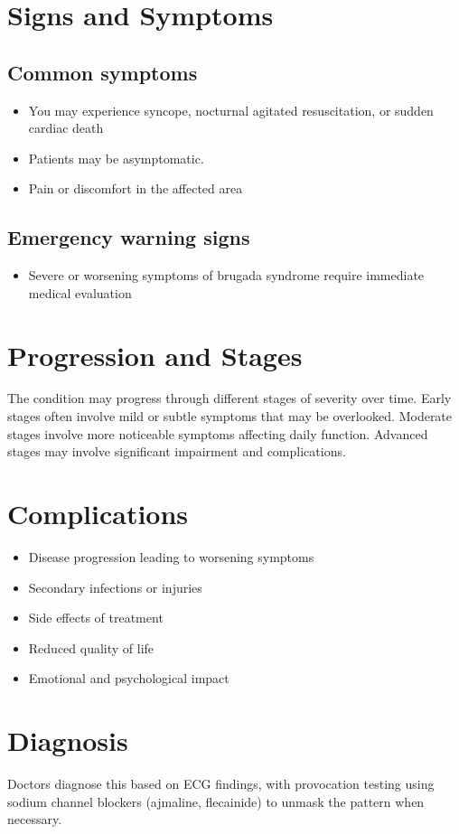 \section{Signs and Symptoms}

\subsection{Common symptoms}
\begin{itemize}[noitemsep]
  \item You may experience syncope, nocturnal agitated resuscitation, or sudden cardiac death
  \item Patients may be asymptomatic.
  \item Pain or discomfort in the affected area
  \end{itemize}

\subsection{Emergency warning signs}
\begin{itemize}[noitemsep]
  \item Severe or worsening symptoms of brugada syndrome require immediate medical evaluation
\end{itemize}
\section{Progression and Stages}
The condition may progress through different stages of severity over time. Early stages often involve mild or subtle symptoms that may be overlooked. Moderate stages involve more noticeable symptoms affecting daily function. Advanced stages may involve significant impairment and complications.
\section{Complications}
\begin{itemize}[noitemsep]
  \item Disease progression leading to worsening symptoms
  \item Secondary infections or injuries
  \item Side effects of treatment
  \item Reduced quality of life
  \item Emotional and psychological impact
\end{itemize}
\section{Diagnosis}
Doctors diagnose this based on ECG findings, with provocation testing using sodium channel blockers (ajmaline, flecainide) to unmask the pattern when necessary.

